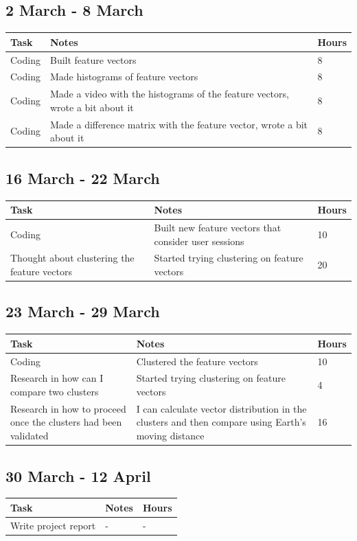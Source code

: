 \documentclass[11pt, oneside]{article}   	%
\begin{document}
\subsection{2 March - 8 March}
\begin{tabularx}{\linewidth}{|X|X|X|}
  \hline
  Task & Notes & Hours \\
  \hline
  Coding & Built feature vectors & 8 \\
  \hline
  Coding & Made histograms of feature vectors & 8 \\
  \hline
  Coding & Made a video with the histograms of the feature vectors, wrote a bit about it & 8 \\
  \hline
  Coding & Made a difference matrix with the feature vector, wrote a bit about it & 8 \\
  \hline
\end{tabularx}

\subsection{16 March - 22 March}
\begin{tabularx}{\linewidth}{|X|X|X|}
  \hline
  Task & Notes & Hours \\
  \hline
  Coding & Built new feature vectors that consider user sessions & 10 \\
  \hline
  Thought about clustering the feature vectors & Started trying clustering on feature vectors & 20 \\
  \hline
\end{tabularx}

\subsection{23 March - 29 March}
\begin{tabularx}{\linewidth}{|X|X|X|}
  \hline
  Task & Notes & Hours \\
  \hline
  Coding & Clustered the feature vectors & 10 \\
  \hline
  Research in how can I compare two clusters & Started trying clustering on feature vectors & 4 \\
  \hline
  Research in how to proceed once the clusters had been validated & I can calculate vector distribution in the clusters and then compare using Earth's moving distance & 16 \\
  \hline
\end{tabularx}

\subsection{30 March - 12 April}
\begin{tabularx}{\linewidth}{|X|X|X|}
  \hline
  Task & Notes & Hours \\
  \hline
  Write project report & - & - \\
   \hline
\end{tabularx}
\end{document}
